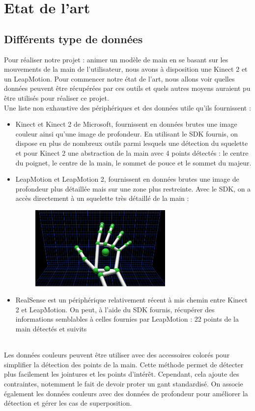 \chapter{Etat de l'art}

\section{Différents type de données}
Pour réaliser notre projet : animer un modèle de main en se basant sur les mouvements de la main de l'utilisateur, nous avons à disposition une 
Kinect 2 et un LeapMotion. Pour commencer notre état de l'art, nous allons voir quelles données peuvent être récupérées par ces outils et 
quels autres moyens auraient pu être utilisés pour réaliser ce projet.\\

Une liste non exhaustive des périphériques et des données utile qu'ils fournissent : 
\begin{itemize}
  \item Kinect et Kinect 2 de Microsoft, fournissent en données brutes une image couleur ainsi qu'une image de profondeur. 
En utilisant le SDK fournis, on dispose en plus de nombreux outils parmi lesquels une détection du squelette et pour Kinect 2 
une abstraction de la main avec 4 points détectés : le centre du poignet, le centre de la main, le sommet de pouce et le sommet du majeur. 
  \item LeapMotion et LeapMotion 2, fournissent en données brutes une image de profondeur plus détaillée mais sur une zone 
plus restreinte. Avec le SDK, on a accès directement à un squelette très détaillé de la main :
    \begin{figure}[!h]
    \center
    \includegraphics[width=7cm]{images/SDK_LeapMotion.png}
    \end{figure}
  \item RealSense est un périphérique relativement récent à mis chemin entre Kinect 2 et LeapMotion. On peut, à l'aide du SDK fournis, récupérer des informations semblables à celles fournies par LeapMotion : 
  22 points de la main détectés et suivits
\end{itemize}
\ \\
Les données couleurs peuvent être utiliser avec des accessoires colorés pour simplifier la détection des points de la main. \cite{wang2009real} 
Cette méthode permet de détecter plus facilement les jointures et les points d'intér\^{e}t. 
Cependant, cela ajoute des contraintes, notemment le fait de devoir proter un gant standardisé.
On associe également les données couleurs avec des données de profondeur pour améliorer la détection et gérer les cas de superposition. \cite{van2011combining}

